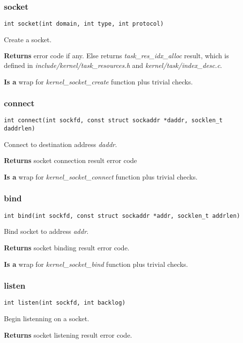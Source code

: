 \documentclass[12pt,a4paper]{article}
\begin{document}
\subsubsection{socket}
\label{sec:socket_c_socket}
\begin{verbatim}
int socket(int domain, int type, int protocol)
\end{verbatim}
Create a socket.

{\bf Returns} error code if any. Else returns
{\it task\_res\_idx\_alloc} result, which is defined in
{\it include/kernel/task\_resources.h} and {\it kernel/task/index\_desc.c}.

{\bf Is a} wrap for {\it kernel\_socket\_create} function plus trivial checks.

\subsubsection{connect}
\label{sec:socket_c_connectn}
\begin{verbatim}
int connect(int sockfd, const struct sockaddr *daddr, socklen_t daddrlen)
\end{verbatim}
Connect to destination address {\it daddr}.

{\bf Returns} socket connection result error code

{\bf Is a} wrap for {\it kernel\_socket\_connect} function  plus trivial checks.

\subsubsection{bind}
\label{sec:socket_c_bind}
\begin{verbatim}
int bind(int sockfd, const struct sockaddr *addr, socklen_t addrlen)
\end{verbatim}
Bind socket to address {\it addr}.

{\bf Returns} socket binding result error code.

{\bf Is a} wrap for {\it kernel\_socket\_bind} function  plus trivial checks.

\subsubsection{listen}
\label{sec:socket_c_listen}
\begin{verbatim}
int listen(int sockfd, int backlog)
\end{verbatim}
Begin listenning on a socket.

{\bf Returns} socket listening result error code.
\end{document}
